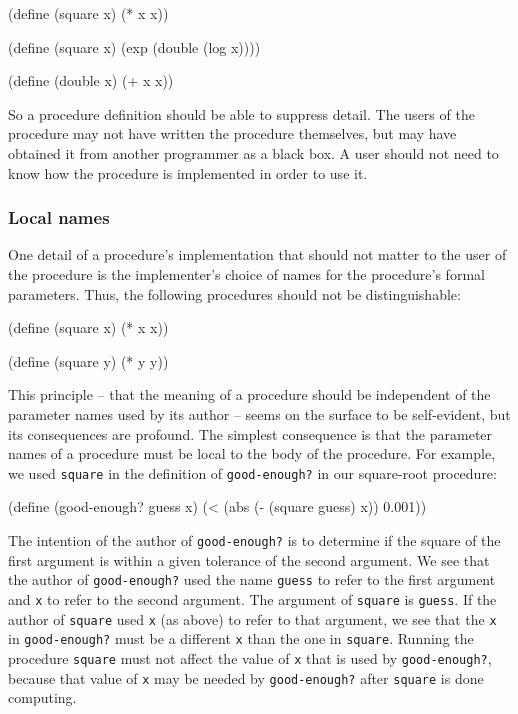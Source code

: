 \begin{schemedisplay}
\begin{schemedisplay}
(define (square x) (* x x))

(define (square x) 
  (exp (double (log x))))

(define (double x) (+ x x))
\end{schemedisplay}

So a procedure definition should be able to suppress detail.  The
users of the procedure may not have written the procedure themselves,
but may have obtained it from another programmer as a black box.  A
user should not need to know how the procedure is implemented in order
to use it.

\subsubsection*{Local names}

One detail of a procedure's implementation that should not matter to
the user of the procedure is the implementer's choice of names for the
procedure's formal parameters.  Thus, the following procedures should
not be distinguishable:

\begin{schemedisplay}
(define (square x) (* x x))

(define (square y) (* y y))
\end{schemedisplay}

This principle -- that the meaning of a procedure should be independent
of the parameter names used by its author -- seems on the surface to be
self-evident, but its consequences are profound.  The simplest
consequence is that the parameter names of a procedure must be local
to the body of the procedure.  For example, we used \texttt{square} in
the definition of \texttt{good-enough?} in our square-root procedure:

\begin{schemedisplay}
(define (good-enough? guess x)
  (< (abs (- (square guess) x)) 0.001))
\end{schemedisplay}

The intention of the author of \texttt{good-enough?} is to determine if
the square of the first argument is within a given tolerance of the
second argument.  We see that the author of \texttt{good-enough?} used
the name \texttt{guess} to refer to the first argument and \texttt{x} to
refer to the second argument.  The argument of \texttt{square} is \texttt{guess}.  If the author of \texttt{square} used \texttt{x} (as above)
to refer to that argument, we see that the \texttt{x} in \texttt{good-enough?} must be a different \texttt{x} than the one in \texttt{square}.  Running the procedure \texttt{square} must not affect the value
of \texttt{x} that is used by \texttt{good-enough?}, because that value of
\texttt{x} may be needed by \texttt{good-enough?} after \texttt{square} is done
computing.


\end{schemedisplay}
